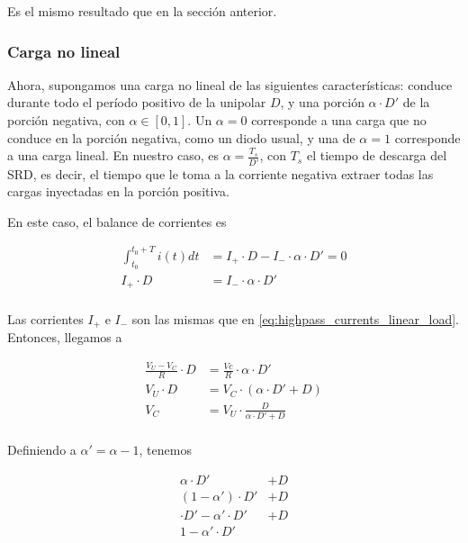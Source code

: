 Es el mismo resultado que en la sección anterior.

\subsubsection{Carga no lineal}

Ahora, supongamos una carga no lineal de las siguientes características: conduce
durante todo el período positivo de la unipolar $D$, y una porción $\alpha \cdot
D'$ de la porción negativa, con $\alpha \in \left[0, 1 \right]$. Un $\alpha=0$
corresponde a una carga que no conduce en la porción negativa, como un diodo
usual, y una de $\alpha=1$ corresponde a una carga lineal. En nuestro caso, es
$\alpha = \frac{T_s}{D'}$, con $T_s$ el tiempo de descarga del SRD, es decir,
el tiempo que le toma  a la corriente negativa extraer todas las cargas
inyectadas en la porción positiva.

En este caso, el balance de corrientes es

\begin{equation}
    \label{eq:current_balance_capacitor_linear_load}
    \begin{aligned}
        \int_{t_0}^{t_0+T} i(t)dt &= I_+ \cdot D - I_- \cdot \alpha \cdot D' = 0 \\
        I_+ \cdot D &= I_- \cdot \alpha \cdot D' \\
    \end{aligned}
\end{equation}

Las corrientes $I_+$ e $I_-$ son las mismas que en
\ref{eq:highpass_currents_linear_load}. Entonces, llegamos a

\begin{equation}
    \label{eq:vc_non_linear_load_0}
    \begin{aligned}
        \frac{V_U-V_C}{R} \cdot D &= \frac{Vc}{R} \cdot \alpha \cdot D' \\
        V_U \cdot D &= V_C \cdot \left( \alpha \cdot D'+D \right) \\
        V_C &= V_U \cdot \frac{D}{\alpha \cdot D' + D}  \\
    \end{aligned}
\end{equation}

Definiendo a $\alpha'=\alpha-1$, tenemos

\begin{equation}
    \label{eq:vc_non_linear_load}
    \begin{aligned}
        \alpha \cdot D' &+ D \\
        (1-\alpha') \cdot D' &+ D \\
        \cdot D' - \alpha' \cdot D' &+ D \\
        1 - \alpha' \cdot D' & \\
    \end{aligned}
\end{equation}


